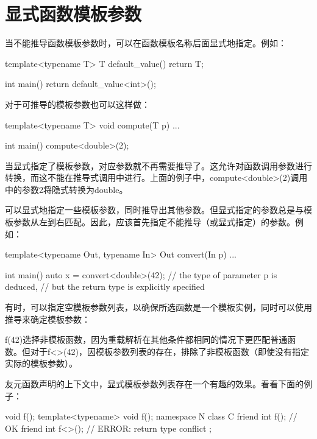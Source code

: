 \section{显式函数模板参数}
当不能推导函数模板参数时，可以在函数模板名称后面显式地指定。例如：

\begin{cpp}
template<typename T> T default_value() {
	return T{};
}

int main() {
	return default_value<int>();
}
\end{cpp}

对于可推导的模板参数也可以这样做：

\begin{cpp}
template<typename T> void compute(T p) {
	...
}

int main() {
	compute<double>(2);
}
\end{cpp}

当显式指定了模板参数，对应参数就不再需要推导了。这允许对函数调用参数进行转换，而这不能在推导式调用中进行。上面的例子中，compute<double>(2)调用中的参数2将隐式转换为double。

可以显式地指定一些模板参数，同时推导出其他参数。但显式指定的参数总是与模板参数从左到右匹配。因此，应该首先指定不能推导（或显式指定）的参数。例如：

\begin{cpp}
template<typename Out, typename In>
Out convert(In p) {
	...
}

int main() {
	auto x = convert<double>(42); // the type of parameter p is deduced,
	// but the return type is explicitly specified
}
\end{cpp}

有时，可以指定空模板参数列表，以确保所选函数是一个模板实例，同时可以使用推导来确定模板参数：


f(42)选择非模板函数，因为重载解析在其他条件都相同的情况下更匹配普通函数。但对于f<>(42)，因模板参数列表的存在，排除了非模板函数（即使没有指定实际的模板参数）。

友元函数声明的上下文中，显式模板参数列表存在一个有趣的效果。看看下面的例子：

\begin{cpp}
void f();
template<typename> void f();
namespace N {
	class C {
		friend int f(); // OK
		friend int f<>(); // ERROR: return type conflict
	};
}
\end{cpp}

